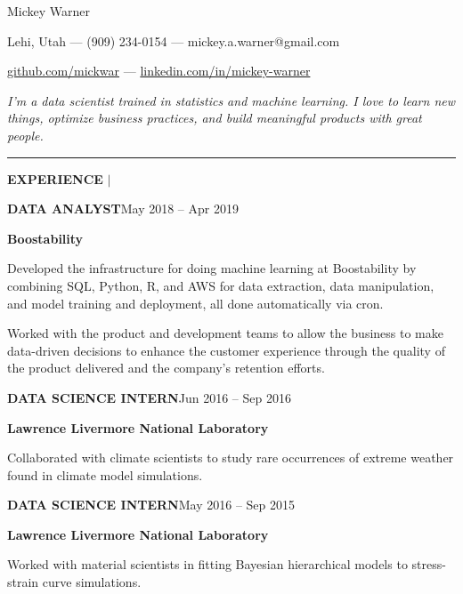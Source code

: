 \documentclass[12pt]{article}
\newcommand{\entrypar}[5]{
    \textbf{\MakeUppercase{#1}}\hfill #3 -- #4

    \textbf{#2}

    #5
    }
\begin{document}

\begin{center}
\begin{Huge}
Mickey Warner
\end{Huge}
\end{center}

\hspace{85pt} Lehi, Utah --- (909) 234-0154 --- mickey.a.warner@gmail.com

\hspace{85pt} \href{https://www.github.com/mickwar}{github.com/mickwar} --- \href{https://www.linkedin.com/in/mickey-warner/}{linkedin.com/in/mickey-warner}
\smallskip
\smallskip
\smallskip
\smallskip
\smallskip

\emph{I'm a data scientist trained in statistics and machine learning. I love to learn new things, optimize business practices, and build meaningful products with great people.}
\smallskip
\bigskip

\hrule

\bigskip


\begin{minipage}[t]{0.19\textwidth}
    \begin{flushright}
        \textbf{EXPERIENCE} $\vert$ \ \
    \end{flushright}
\end{minipage}%
%
\begin{minipage}[t]{0.81\textwidth}
    \begin{flushleft}
        \entrypar{Data analyst}{Boostability}{May 2018}{Apr 2019}{
Developed the infrastructure for doing machine learning at Boostability by combining SQL, Python, R, and AWS for data extraction, data manipulation, and model training and deployment, all done automatically via cron.
\bigskip

Worked with the product and development teams to allow the business to make data-driven decisions to enhance the customer experience through the quality of the product delivered and the company's retention efforts.
        }

        \bigskip

        \entrypar{Data science intern}{Lawrence Livermore National Laboratory}{Jun 2016}{Sep 2016}{
Collaborated with climate scientists to study rare occurrences of extreme weather found in climate model simulations.
        }
        \bigskip

        \entrypar{Data science intern}{Lawrence Livermore National Laboratory}{May 2016}{Sep 2015}{
Worked with material scientists in fitting Bayesian hierarchical models to stress-strain curve simulations.
        }
    \end{flushleft}
\end{minipage}
\end{document}
